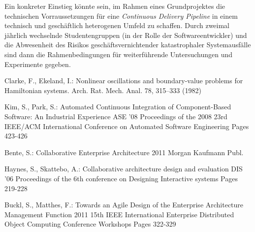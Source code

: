 \documentclass{llncs}
\begin{document}
Ein konkreter Einstieg könnte sein, im Rahmen eines Grundprojektes die technischen Vorraussetzungen für eine \textit{Continuous Delivery Pipeline} in einem technisch und geschäftlich heterogenen Umfeld zu schaffen. Durch zweimal jährlich wechselnde Studentengruppen (in der Rolle der Softwareentwickler) und die Abwesenheit des Risikos geschäftsvernichtender katastrophaler Systemausfälle sind dann die Rahmenbedingungen für weiterführende Untersuchungen und Experimente gegeben.

\cite{SeojinKim:2008:ACI:1642931.1642990}
\cite{clar:eke}


\begin{thebibliography}{1}
Clarke, F., Ekeland, I.:
Nonlinear oscillations and boundary-value problems for
Hamiltonian systems.
Arch. Rat. Mech. Anal. 78, 315--333 (1982)

Kim, S., Park, S.:
Automated Continuous Integration of Component-Based Software: An Industrial Experience
ASE '08 Proceedings of the 2008 23rd IEEE/ACM International Conference on Automated Software Engineering
Pages 423-426

Bente, S.:
Collaborative Enterprise Architecture
2011 Morgan Kaufmann Publ.

Haynes, S., Skattebo, A.:
Collaborative architecture design and evaluation
DIS '06 Proceedings of the 6th conference on Designing Interactive systems
Pages 219-228

Buckl, S., Matthes, F.:
Towards an Agile Design of the Enterprise Architecture Management Function
2011 15th IEEE International Enterprise Distributed Object Computing Conference Workshops
Pages 322-329

%
\end{thebibliography}
\end{document}
